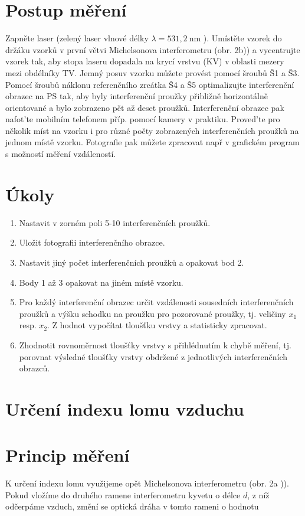 \documentclass[czech,11pt,a4paper]{article}
\begin{document}
\begin{multicols}{2}
	\section*{Postup měření}
	Zapněte laser (zelený laser vlnové délky $\lambda=531,2 \mathrm{~nm}$ ). Umístěte vzorek do držáku vzorků v první větvi Michelsonova interferometru (obr. 2b)) a vycentrujte vzorek tak, aby stopa laseru dopadala na krycí vrstvu (KV) v oblasti mezery mezi obdélníky TV. Jemný posuv vzorku můžete provést pomocí šroubů Š1 a Š3. Pomocí šroubů náklonu referenčního zrcátka Š4 a Š5 optimalizujte interferenční obrazec na PS tak, aby byly interferenční proužky přibližně horizontálně orientované a bylo zobrazeno pět až deset proužků. Interferenční obrazec pak nafot’te mobilním telefonem příp. pomocí kamery v praktiku. Proved’te pro několik míst na vzorku i pro různé počty zobrazených interferenčních proužků na jednom místě vzorku. Fotografie pak můžete zpracovat např v grafickém program s možností měření vzdáleností.
	
	\section*{Úkoly}
	\begin{enumerate}
		\item Nastavit v zorném poli 5-10 interferenčních proužků.
		\item Uložit fotografii interferenčního obrazce.
		\item Nastavit jiný počet interferenčních proužků a opakovat bod 2.
		\item Body 1 až 3 opakovat na jiném místě vzorku.
		\item Pro každý interferenční obrazec určit vzdálenosti sousedních interferenčních proužků a výšku schodku na proužku pro pozorované proužky, tj. veličiny $x_{1}$ resp. $x_{2}$. Z hodnot vypočítat tloušťku vrstvy a statisticky zpracovat.
		\item Zhodnotit rovnoměrnost tloušťky vrstvy s přihlédnutím k chybě měření, tj. porovnat výsledné tloušťky vrstvy obdržené z jednotlivých interferenčních obrazců.
	\end{enumerate}
	
	\section*{Určení indexu lomu vzduchu}
	\section*{Princip měření}
	K určení indexu lomu využijeme opět Michelsonova interferometru (obr. 2a )). Pokud vložíme do druhého ramene interferometru kyvetu o délce $d$, z níž odčerpáme vzduch, změní se optická dráha v tomto rameni o hodnotu
	

\end{multicols}
\end{document}

